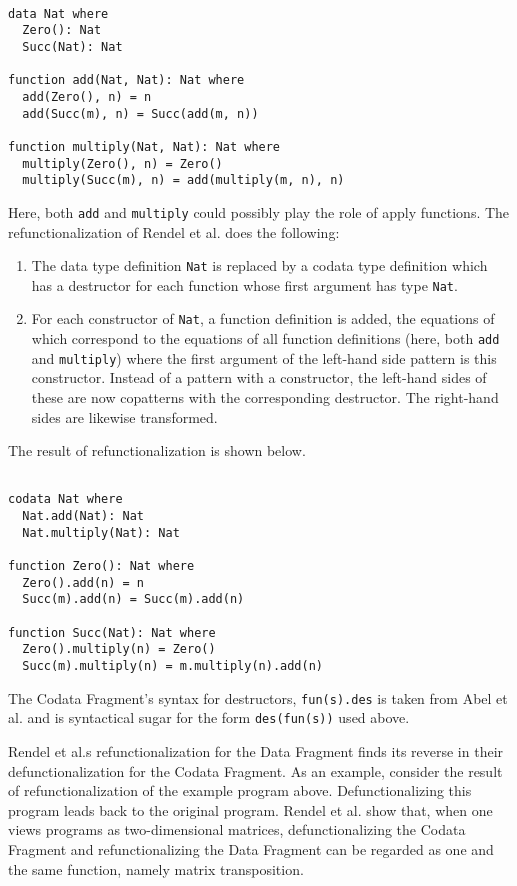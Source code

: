\begin{lstlisting}

data Nat where
  Zero(): Nat
  Succ(Nat): Nat

function add(Nat, Nat): Nat where
  add(Zero(), n) = n
  add(Succ(m), n) = Succ(add(m, n))

function multiply(Nat, Nat): Nat where
  multiply(Zero(), n) = Zero()
  multiply(Succ(m), n) = add(multiply(m, n), n)

\end{lstlisting}

Here, both \texttt{add} and \texttt{multiply} could possibly play the role of apply functions. The refunctionalization of Rendel et al. does the following:
\begin{enumerate}
\item The data type definition \texttt{Nat} is replaced by a codata type definition which has a destructor for each function whose first argument has type \texttt{Nat}.
\item For each constructor of \texttt{Nat}, a function definition is added, the equations of which correspond to the equations of all function definitions (here, both \texttt{add} and \texttt{multiply}) where the first argument of the left-hand side pattern is this constructor. Instead of a pattern with a constructor, the left-hand sides of these are now copatterns with the corresponding destructor. The right-hand sides are likewise transformed.
\end{enumerate}
The result of refunctionalization is shown below.

\begin{lstlisting}

codata Nat where
  Nat.add(Nat): Nat
  Nat.multiply(Nat): Nat

function Zero(): Nat where
  Zero().add(n) = n
  Succ(m).add(n) = Succ(m).add(n)

function Succ(Nat): Nat where
  Zero().multiply(n) = Zero()
  Succ(m).multiply(n) = m.multiply(n).add(n)

\end{lstlisting}
The Codata Fragment's syntax for destructors, \texttt{fun(s).des} is taken from Abel et al.\cite{abel13copatterns} and is syntactical sugar for the form \texttt{des(fun(s))} used above.

Rendel et al.s\cite{rendel15automatic} refunctionalization for the Data Fragment finds its reverse in their defunctionalization for the Codata Fragment. As an example, consider the result of refunctionalization of the example program above. Defunctionalizing this program leads back to the original program. Rendel et al. show that, when one views programs as two-dimensional matrices, defunctionalizing the Codata Fragment and refunctionalizing the Data Fragment can be regarded as one and the same function, namely matrix transposition.

